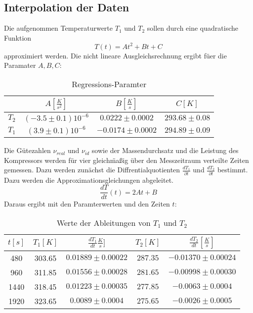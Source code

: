 \documentclass[11pt]{article}
\begin{document}
\subsection{Interpolation der Daten}
Die aufgenommen Temperaturwerte $T_1$ und $T_2$ sollen durch eine quadratische Funktion
\begin{equation}
T(t) = At^2 + Bt + C
\end{equation}
approximiert werden. Die  nicht lineare Ausgleichsrechnung ergibt f\"uer die Paramater $A, B, C$:
\begin{table}[H]
\centering
\begin{tabular}{c|c|c|c}

& $A [\frac{K}{s^2}]$ & $B [\frac{K}{s}]$ & $C [K]$ \\
\hline
$T_2$& $(-3.5\pm0.1)10^{-6}$ & $0.0222\pm0.0002$ &$ 293.68\pm0.08$\\
$T_1$ & $(3.9\pm0.1)10^{-6}$ & $-0.0174\pm0.0002$ & $294.89\pm0.09$\\
\end{tabular}
\caption{Regressions-Paramter}
\end{table} \noindent
Die  G\"utezahlen $\nu_{real}$ und $\nu_{id}$ sowie der Massendurchsatz und die Leistung des Kompressors werden f\"ur vier gleich\"ma\ss ig \"uber den Messzeitraum verteilte Zeiten gemessen. Dazu werden zun\"achst die Diffrentialquotienten $\frac{d T_1}{\partial t}$ und $\frac{dT_2}{\partial t}$ bestimmt. Dazu werden die Approximationsgleichungen abgeleitet. 
\begin{equation}
\frac{dT}{dt}(t) = 2At + B
\end{equation}
Daraus ergibt mit den Paramterwerten und den Zeiten $t$:
\begin{table}[H]
\centering 
\begin{tabular}{c|c|c|c|c}
\hline
$t [s]$ & $T_1 [K]$ & $\frac{dT_1}{dt} \frac{K}{s}]$ & $T_2 [K]$ & $\frac{dT_2}{dt} [\frac Ks]$  \\
\hline
480 & 303.65 & $0.01889\pm0.00022$ & $287.35$ & $-0.01370\pm0.00024 $\\
960 & 311.85 & $0.01556\pm0.00028$ & $281.65$ &$ -0.00998\pm0.00030$ \\
1440 & 318.45 & $0.01223\pm0.00035$ &$ 277.85$ & $-0.0063\pm0.0004$ \\
1920 & 323.65 & $0.0089\pm0.0004$ & $275.65$ &$ -0.0026\pm0.0005$ \\

\end{tabular}
\caption{Werte der Ableitungen von $T_1$ und $T_2$}
\label{ableitungen}
\end{table}
\end{document}
